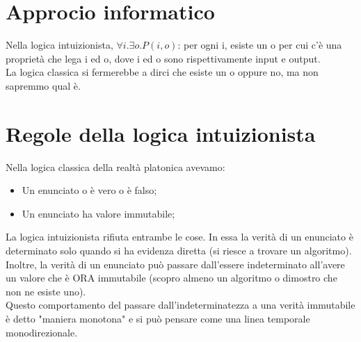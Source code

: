 \documentclass[12pt]{article}
\begin{document}
\section{Approcio informatico}
Nella logica intuizionista, $\forall i. \exists o. P(i, o)$: per ogni i, esiste un o per cui c'è una proprietà che lega i ed o, dove i ed o sono rispettivamente input e output. \\
La logica classica si fermerebbe a dirci che esiste un o oppure no, ma non sapremmo qual è. \\
\section{Regole della logica intuizionista}
Nella logica classica della realtà platonica avevamo:
\begin{itemize}
    \item Un enunciato o è vero o è falso;
    \item Un enunciato ha valore immutabile;
\end{itemize}
La logica intuizionista rifiuta entrambe le cose. In essa la verità di un enunciato è determinato solo quando si ha evidenza diretta (si riesce a trovare un algoritmo). Inoltre, la verità di un enunciato può passare dall'essere indeterminato all'avere un valore che è ORA immutabile (scopro almeno un algoritmo o dimostro che non ne esiste uno). \\
Questo comportamento del passare dall'indeterminatezza a una verità immutabile è detto "maniera monotona" e si può pensare come una linea temporale monodirezionale.
\end{document}
